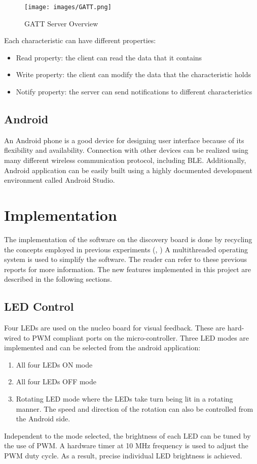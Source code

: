 \documentclass[12pt]{article}
\begin{document}
\begin{figure}[!htb]
 \centering
 \texttt{[image: images/GATT.png]}
 \caption{GATT Server Overview}
 \label{fig:gatt}
\end{figure}

Each characteristic can have different properties:
\begin{itemize}
\item Read property: the client can read the data that it contains
\item Write property: the client can modify the data that the characteristic holds
\item Notify property: the server can send notifications to different characteristics
\end{itemize}

\subsection{Android}
An Android phone is a good device for designing user interface because of its flexibility and availability. Connection with other devices can be realized using many different wireless communication protocol, including BLE. Additionally, Android application can be easily built using a highly documented development environment called Android Studio.

\section{Implementation}
The implementation of the software on the discovery board is done by recycling the concepts employed in previous experiments (\cite{Lab2report}, \cite{Lab4report}) A multithreaded operating system is used to simplify the software. The reader can refer to these previous reports for more information. The new features implemented in this project are described in the following sections.

\subsection{LED Control}
Four LEDs are used on the nucleo board for visual feedback. These are hard-wired to PWM compliant ports on the micro-controller. Three LED modes are implemented and can be selected from the android application:
\begin{enumerate}
\item All four LEDs ON mode
\item All four LEDs OFF mode
\item Rotating LED mode where the LEDs take turn being lit in a rotating manner. The speed and direction of the rotation can also be controlled from the Android side. 
\end{enumerate}
Independent to the mode selected, the brightness of each LED can be tuned by the use of PWM. A hardware timer at 10 MHz frequency is used to adjust the PWM duty cycle. As a result, precise individual LED brightness is achieved.
\end{document}
